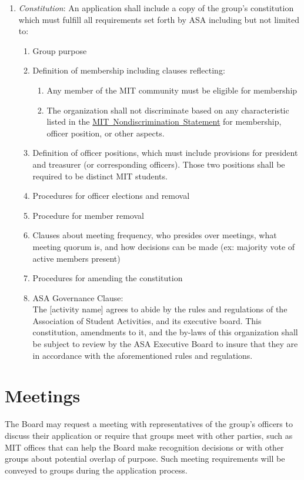 \documentclass[12pt]{article}
\newcommand{\NDS}{\href{https://handbook.mit.edu/nondiscrimination}{MIT~Nondiscrimination~Statement}\xspace}
\begin{document}
\begin{enumerate}
    \item \textit{Constitution}: An application shall include a copy of the group's constitution which must fulfill
        all requirements set forth by ASA including but not limited to:
    \begin{enumerate}
        \item Group purpose
        \item Definition of membership including clauses reflecting:
        \begin{enumerate}
            \item Any member of the MIT community must be eligible for membership
            \item The organization shall not discriminate based on any characteristic listed in the
                \NDS for membership, officer position, or other aspects.
        \end{enumerate}
    \item Definition of officer positions, which must include provisions for president and
        treasurer (or corresponding officers).
    Those two positions shall be required to be distinct MIT students.
    \item Procedures for officer elections and removal
    \item Procedure for member removal
    \item Clauses about meeting frequency, who presides over meetings, what meeting quorum is,
        and how decisions can be made (ex: majority vote of active members present)
    \item Procedures for amending the constitution
    \item ASA Governance Clause:\\
        The [activity name] agrees to abide by the rules and regulations of the Association of
            Student Activities, and its executive board.
        This constitution, amendments to it, and the by-laws of this organization shall be subject
            to review by the ASA Executive Board to insure that they are in accordance with the
            aforementioned rules and regulations.
    \end{enumerate}
\end{enumerate}

\section{Meetings}
The Board may request a meeting with representatives of the group's officers to discuss their
    application or require that groups meet with other parties, such as MIT offices that can help the
    Board make recognition decisions or with other groups about potential overlap of purpose.
Such meeting requirements will be conveyed to groups during the application process.
\end{document}
